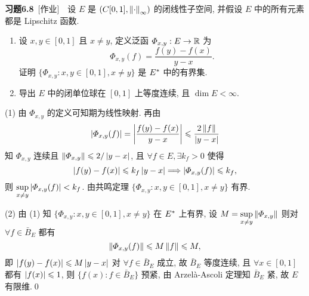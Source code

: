 	\textbf{习题6.8}\ [作业]\ \ 设 $ E $ 是 $ (C[0, 1], \left\| \cdot \right\|_{\infty}) $ 的闭线性子空间, 并假设 $ E $ 中的所有元素都是 Lipschitz 函数.
	\begin{enumerate}[(1)]
		\item 设 $ x, y\in[0, 1] $ 且 $ x\ne y $, 定义泛函 $ \varPhi_{x, y}:E\to\mathbb{R} $ 为
		\[
			\varPhi_{x, y}(f)=\frac{f(y)-f(x)}{y-x}.
		\]
		证明 $\{ \varPhi_{x, y}:x, y\in[0, 1], x\ne y \}$ 是 $ E^{*} $ 中的有界集.
		\item 导出 $ E $ 中的闭单位球在 $ [0, 1] $ 上等度连续, 且 $ \dim E<\infty $.
	\end{enumerate}
	\begin{Proof}
		(1) 由 $ \varPhi_{x, y} $ 的定义可知期为线性映射. 再由
		\[
			\left| \varPhi_{x, y}(f) \right| =\left| \frac{f(y)-f(x)}{y-x} \right| \leqslant\frac{2\left\| f \right\|}{\left| y-x \right| }
		\]
		知 $ \varPhi_{x, y} $ 连续且 $ \left\| \varPhi_{x, y} \right\|\leqslant2/\left| y-x \right|  $, 且 $ \forall f\in E, \exists k_{f}>0 $ 使得
		\[
			\left| f(y)-f(x) \right| \leqslant k_{f}\left| y-x \right| \Longrightarrow \left| \varPhi_{x, y}(f) \right| \leqslant k_{f},
		\]
		则 $\sup\limits_{x\ne y}\left| \varPhi_{x, y}(f) \right| <k_{f} $. 由共鸣定理 $\{ \varPhi_{x, y}:x, y\in[0, 1], x\ne y \}$ 有界.

		(2) 由 (1) 知 $\{ \varPhi_{x, y}:x, y\in[0, 1], x\ne y \}$ 在 $ E^{*} $ 上有界, 设 $ M=\sup\limits_{x\ne y}\left\| \varPhi_{x, y} \right\| $ 则对 $ \forall f\in\bar{B}_{E} $ 都有
		\[
			\left\| \varPhi_{x, y}(f) \right\|\leqslant M\left\| f \right\|\leqslant M,
		\]
		即 $ \left| f(y)-f(x) \right| \leqslant M\left| y-x \right|  $ 对 $ \forall f\in\bar{B}_{E} $ 成立, 故 $ \bar{B}_{E} $ 等度连续, 且 $ \forall x\in[0, 1] $ 都有 $ \left| f(x) \right| \leqslant 1 $, 则 $ \{ f(x):f\in\bar{B}_{E} \} $ 预紧, 由 Arzel\`a-Ascoli 定理知 $ \bar{B}_{E} $ 紧, 故 $ E $ 有限维.\qed
	\end{Proof}

